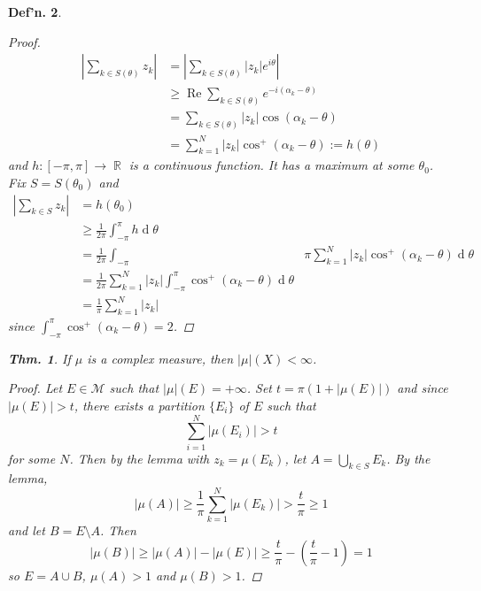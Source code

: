 \documentclass[12pt, a4paper]{book}
\DeclareMathOperator{\R}{\mathbb{R}}
\DeclareMathOperator{\re}{Re}
\renewcommand{\d}[1]{\ensuremath{\operatorname{d}\!{#1}}} %
\newtheorem{theorem}{Thm.}[section]
\newtheorem{definition}[theorem]{Def'n.}
\theoremstyle{nonumberplain}
\newtheorem{proof}{Proof}
\begin{document}
\begin{definition}
\begin{proof}
\begin{align*}
        \left\lvert\sum\limits_{k\in S(\theta)}z_k\right\rvert&=\left\lvert\sum\limits_{k\in S(\theta)}|z_k|e^{i\theta}\right\rvert\\
                                                              &\geq \re\sum\limits_{k\in S(\theta)}e^{-i(\alpha_k-\theta)}\\
                                                              &= \sum\limits_{k\in S(\theta)}|z_k|\cos(\alpha_k-\theta)\\
                                                              &= \sum\limits_{k=1}^N|z_k|\cos^+(\alpha_k-\theta):=h(\theta)
    \end{align*}
    and $h:[-\pi,\pi]\to\R$ is a continuous function.
    It has a maximum at some $\theta_0$.
    Fix $S=S(\theta_0)$ and
    \begin{align*}
        \left\lvert\sum\limits_{k\in S}z_k\right\rvert &= h(\theta_0)\\
                                                       &\geq \frac{1}{2\pi}\int_{-\pi}^\pi h\d{\theta}\\
                                                       &=\frac{1}{2\pi}\int_{-\pi}&\pi \sum\limits_{k=1}^N|z_k|\cos^+(\alpha_k-\theta)\d{\theta}\\
                                                       &= \frac{1}{2\pi}\sum\limits_{k=1}^N|z_k|\int_{-\pi}^\pi\cos^+(\alpha_k-\theta)\d{\theta}\\
                                                       &=\frac{1}{\pi}\sum\limits_{k=1}^N|z_k|
    \end{align*}
    since $\int_{-\pi}^\pi\cos^+(\alpha_k-\theta)=2$.
\end{proof}
\begin{theorem}
    If $\mu$ is a complex measure, then $|\mu|(X)<\infty$.
\end{theorem}
\begin{proof}
    Let $E\in\mathcal{M}$ such that $|\mu|(E)=+\infty$.
    Set $t=\pi(1+|\mu(E)|)$ and since $|\mu(E)|>t$, there exists a partition $\{E_i\}$ of $E$ such that
    \[\sum\limits_{i=1}^N|\mu(E_i)|>t\]
    for some $N$.
    Then by the lemma with $z_k=\mu(E_k)$, let $A=\bigcup\limits_{k\in S}E_k$.
    By the lemma,
    \[|\mu(A)|\geq\frac{1}{\pi}\sum\limits_{k=1}^N|\mu(E_k)|>\frac{t}{\pi}\geq 1\]
    and let $B=E\setminus A$.
    Then
    \[|\mu(B)|\geq|\mu(A)|-|\mu(E)|\geq\frac{t}{\pi}-\left(\frac{t}{\pi}-1\right)=1\]
    so $E=A\cup B$, $\mu(A)>1$ and $\mu(B)>1$.


\end{proof}
\end{definition}
\end{document}
